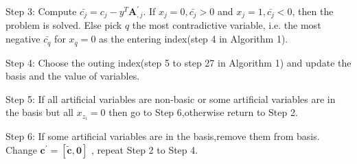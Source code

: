 \documentclass{article}
\begin{document}
Step 3: Compute $\bar{c_j} = c_j - y^T\mathbf{A}_{,j}^{'}$. If $x_j = 0, \bar{c_j} > 0$ and $x_j = 1,\bar{c_j} < 0$, then the problem is solved. Else pick $q$ the most contradictive variable, i.e. the most negative $\bar{c_q}$ for $x_q = 0$ as the entering index(step 4 in Algorithm 1).

Step 4: Choose the outing index(step 5 to step 27 in Algorithm 1) and update the basis and the value of variables.

Step 5: If all artificial variables are non-basic or some artificial variables are in the basis but all $x_{z_i} = 0$ then go to Step 6,otherwise return to Step 2.

Step 6: If some artificial variables are in the basis,remove them from basis. Change $\mathbf{c^{'}}=[\tilde{\mathbf{c}},\mathbf{0}]$ , repeat Step 2 to Step 4.
\end{document}
